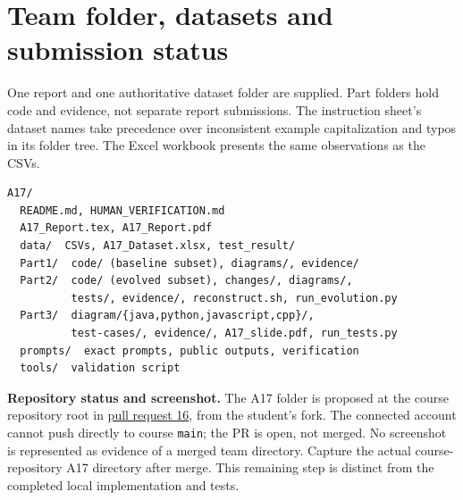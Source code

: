 \documentclass[11pt,a4paper]{article}
\begin{document}
\section{Team folder, datasets and submission status}
One report and one authoritative dataset folder are supplied. Part folders hold
code and evidence, not separate report submissions. The instruction sheet's
dataset names take precedence over inconsistent example capitalization and typos
in its folder tree. The Excel workbook presents the same observations as the CSVs.
\begin{lstlisting}
A17/
  README.md, HUMAN_VERIFICATION.md
  A17_Report.tex, A17_Report.pdf
  data/  CSVs, A17_Dataset.xlsx, test_result/
  Part1/  code/ (baseline subset), diagrams/, evidence/
  Part2/  code/ (evolved subset), changes/, diagrams/,
          tests/, evidence/, reconstruct.sh, run_evolution.py
  Part3/  diagram/{java,python,javascript,cpp}/,
          test-cases/, evidence/, A17_slide.pdf, run_tests.py
  prompts/  exact prompts, public outputs, verification
  tools/  validation script
\end{lstlisting}
\textbf{Repository status and screenshot.} The A17 folder is proposed
at the course repository root in
\href{https://github.com/aswathymohan-amrita/23CSE455_DP_CaseStudy/pull/16}{pull request 16},
from the student's fork. The connected account cannot push directly to course
\texttt{main}; the PR is open, not merged. No screenshot is represented as evidence
of a merged team directory. Capture the actual course-repository A17 directory
after merge. This remaining step is distinct from the completed local
implementation and tests.
\end{document}
